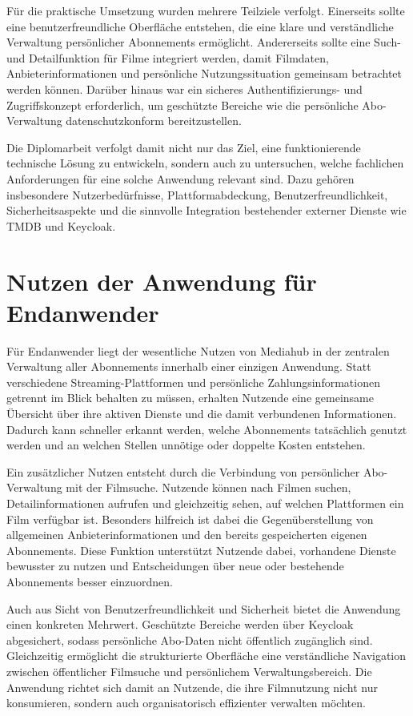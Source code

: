 Für die praktische Umsetzung wurden mehrere Teilziele verfolgt. Einerseits sollte eine benutzerfreundliche Oberfläche entstehen, die eine klare und verständliche Verwaltung persönlicher Abonnements ermöglicht. Andererseits sollte eine Such- und Detailfunktion für Filme integriert werden, damit Filmdaten, Anbieterinformationen und persönliche Nutzungssituation gemeinsam betrachtet werden können. Darüber hinaus war ein sicheres Authentifizierungs- und Zugriffskonzept erforderlich, um geschützte Bereiche wie die persönliche Abo-Verwaltung datenschutzkonform bereitzustellen.

Die Diplomarbeit verfolgt damit nicht nur das Ziel, eine funktionierende technische Lösung zu entwickeln, sondern auch zu untersuchen, welche fachlichen Anforderungen für eine solche Anwendung relevant sind. Dazu gehören insbesondere Nutzerbedürfnisse, Plattformabdeckung, Benutzerfreundlichkeit, Sicherheitsaspekte und die sinnvolle Integration bestehender externer Dienste wie TMDB und Keycloak.

\section{Nutzen der Anwendung für Endanwender}
Für Endanwender liegt der wesentliche Nutzen von \glqq Mediahub\grqq{} in der zentralen Verwaltung aller Abonnements innerhalb einer einzigen Anwendung. Statt verschiedene Streaming-Plattformen und persönliche Zahlungsinformationen getrennt im Blick behalten zu müssen, erhalten Nutzende eine gemeinsame Übersicht über ihre aktiven Dienste und die damit verbundenen Informationen. Dadurch kann schneller erkannt werden, welche Abonnements tatsächlich genutzt werden und an welchen Stellen unnötige oder doppelte Kosten entstehen.

Ein zusätzlicher Nutzen entsteht durch die Verbindung von persönlicher Abo-Verwaltung mit der Filmsuche. Nutzende können nach Filmen suchen, Detailinformationen aufrufen und gleichzeitig sehen, auf welchen Plattformen ein Film verfügbar ist. Besonders hilfreich ist dabei die Gegenüberstellung von allgemeinen Anbieterinformationen und den bereits gespeicherten eigenen Abonnements. Diese Funktion unterstützt Nutzende dabei, vorhandene Dienste bewusster zu nutzen und Entscheidungen über neue oder bestehende Abonnements besser einzuordnen.

Auch aus Sicht von Benutzerfreundlichkeit und Sicherheit bietet die Anwendung einen konkreten Mehrwert. Geschützte Bereiche werden über Keycloak abgesichert, sodass persönliche Abo-Daten nicht öffentlich zugänglich sind. Gleichzeitig ermöglicht die strukturierte Oberfläche eine verständliche Navigation zwischen öffentlicher Filmsuche und persönlichem Verwaltungsbereich. Die Anwendung richtet sich damit an Nutzende, die ihre Filmnutzung nicht nur konsumieren, sondern auch organisatorisch effizienter verwalten möchten.

